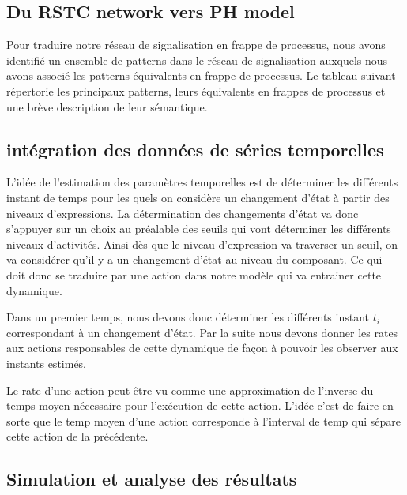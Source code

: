 \documentclass[11pt,a4paper,twoside]{epig}
\begin{document}
\subsection{Du RSTC network vers PH model}


Pour traduire notre réseau de signalisation en frappe de processus, nous avons identifié un ensemble de patterns dans le réseau de signalisation auxquels nous avons 
associé les patterns équivalents en frappe de processus. Le tableau suivant répertorie les principaux patterns, leurs équivalents en frappes de processus et une brève 
description de leur sémantique. 


\subsection{intégration des données de séries temporelles}

L'idée de l'estimation des paramètres temporelles est de déterminer les différents instant de temps pour les quels on considère un changement 
d'état à partir des niveaux d'expressions. La détermination des changements d'état va donc s'appuyer sur un choix au préalable des seuils qui 
vont déterminer les différents niveaux d'activités. Ainsi dès que le niveau d'expression va traverser un seuil, on va considérer qu'il y a un 
changement d'état au niveau du composant. Ce qui doit donc se traduire par une action dans notre modèle qui va entrainer cette dynamique.

Dans un premier temps, nous devons donc déterminer les différents instant $t_{i}$ correspondant à un changement d'état. Par la suite nous devons 
donner les rates aux actions responsables de cette dynamique de façon à pouvoir les observer aux instants estimés.


Le rate d'une action peut être vu comme une approximation de l'inverse  du temps moyen nécessaire pour l'exécution de cette action. L'idée 
c'est de faire en sorte que le temp moyen d'une action corresponde à l'interval de temp qui sépare cette action de la précédente.



\subsection{Simulation et analyse des résultats}
\end{document}

